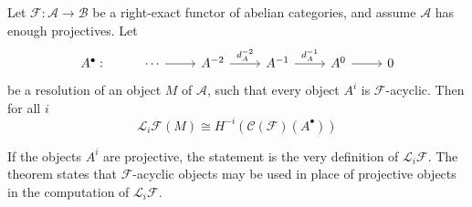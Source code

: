 \begin{theorem}\label{acyclic reso der}
Let $\mathscr{F}:\mathcal{A}\to\mathcal{B}$ be a right-exact functor of abelian categories, and assume $\mathcal{A}$ has enough projectives. Let
\[\begin{tikzcd}
A^\bullet:&\cdots\ar[r]&A^{-2}\ar[r,"d_A^{-2}"]&A^{-1}\ar[r,"d_A^{-1}"]&A^0\ar[r]&0
\end{tikzcd}\]
be a resolution of an object $M$ of $\mathcal{A}$, such that every object $A^i$ is $\mathscr{F}$-acyclic. Then for all $i$
\[\mathcal{L}_i\mathscr{F}(M)\cong H^{-i}(\mathcal{C}(\mathscr{F})(A^\bullet))\]
\end{theorem}
If the objects $A^i$ are projective, the statement is the very definition of $\mathcal{L}_i\mathscr{F}$. The theorem states that $\mathscr{F}$-acyclic objects may be used in place of projective objects
in the computation of $\mathcal{L}_i\mathscr{F}$.

